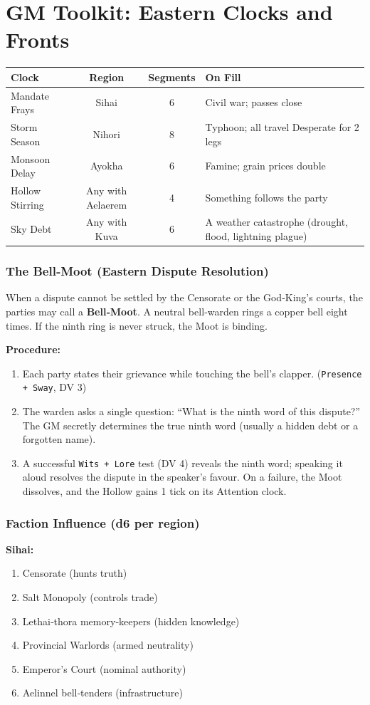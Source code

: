 \documentclass[12pt]{book}
\begin{document}
\chapter{GM Toolkit: Eastern Clocks and Fronts}
\begin{longtable}{X c c X}
\toprule
\textbf{Clock} & \textbf{Region} & \textbf{Segments} & \textbf{On Fill} \\
\midrule
Mandate Frays & Sihai & 6 & Civil war; passes close \\
Storm Season & Nihori & 8 & Typhoon; all travel Desperate for 2 legs \\
Monsoon Delay & Ayokha & 6 & Famine; grain prices double \\
Hollow Stirring & Any with Aelaerem & 4 & Something follows the party \\
Sky Debt & Any with Kuva & 6 & A weather catastrophe (drought, flood, lightning plague) \\
\bottomrule
\end{longtable}

\subsection*{The Bell‑Moot (Eastern Dispute Resolution)}
When a dispute cannot be settled by the Censorate or the God‑King’s courts, the parties may call a \textbf{Bell‑Moot}. A neutral bell‑warden rings a copper bell eight times. If the ninth ring is never struck, the Moot is binding.

\textbf{Procedure:}
\begin{enumerate}
    \item Each party states their grievance while touching the bell’s clapper. (\texttt{Presence + Sway}, DV 3)
    \item The warden asks a single question: “What is the ninth word of this dispute?” The GM secretly determines the true ninth word (usually a hidden debt or a forgotten name).
    \item A successful \texttt{Wits + Lore} test (DV 4) reveals the ninth word; speaking it aloud resolves the dispute in the speaker’s favour. On a failure, the Moot dissolves, and the Hollow gains 1 tick on its Attention clock.
\end{enumerate}

\subsection*{Faction Influence (d6 per region)}
\textbf{Sihai:}
\begin{enumerate}[label=\arabic*.]
    \item Censorate (hunts truth)
    \item Salt Monopoly (controls trade)
    \item Lethai‑thora memory‑keepers (hidden knowledge)
    \item Provincial Warlords (armed neutrality)
    \item Emperor's Court (nominal authority)
    \item Aelinnel bell‑tenders (infrastructure)
\end{enumerate}
\end{document}
